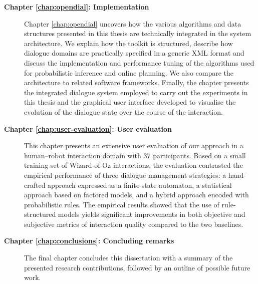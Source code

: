 \begin{description}
\item [\textbf{Chapter \ref{chap:opendial}: Implementation}] \hfill  \vspace{2mm}

Chapter \ref{chap:opendial} uncovers how the various algorithms and data structures presented in this thesis are technically integrated in the system architecture.  We explain how the \opendial{} toolkit is structured, describe how dialogue domains are practically specified in a generic XML format and discuss the implementation and performance tuning of the algorithms used for probabilistic inference and online planning.  We also compare the \opendial{} architecture to related software frameworks.  Finally, the chapter presents the integrated dialogue system employed to carry out the experiments in this thesis and the graphical user interface developed to visualise the evolution of the dialogue state over the course of the interaction. 

\item [\textbf{Chapter \ref{chap:user-evaluation}: User evaluation}] \hfill  \vspace{2mm}

This chapter presents an extensive user evaluation of our approach in a human--robot interaction domain with 37 participants.  Based on a small training set of Wizard-of-Oz interactions, the evaluation contrasted the empirical performance of three dialogue management strategies: a hand-crafted approach expressed as a finite-state automaton, a statistical approach based on factored models, and a hybrid approach encoded with probabilistic rules.  The empirical results showed that the use of rule-structured models yields significant improvements in both objective and subjective metrics of interaction quality compared to the two baselines. \vspace{2mm}


\item [\textbf{Chapter \ref{chap:conclusions}: Concluding remarks}] \hfill  \vspace{2mm}

The final chapter concludes this dissertation with a summary of the presented research contributions, followed by an outline of possible future work.   \vspace{2mm}

\end{description}

